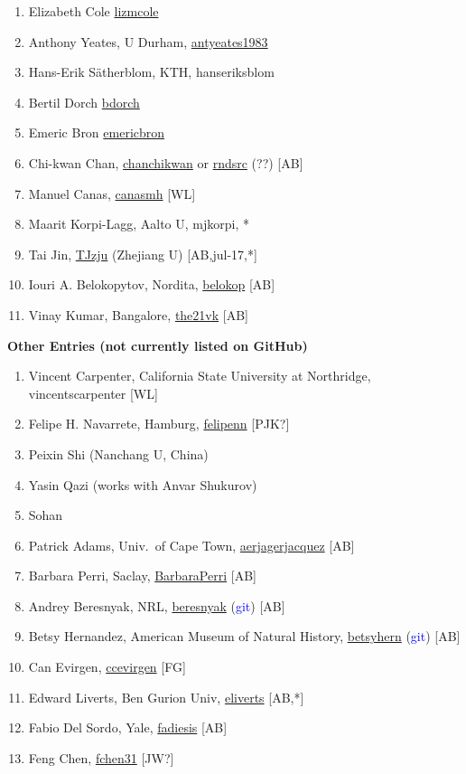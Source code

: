 \documentclass{article}
\def\blue{\textcolor{blue}}
\begin{document}
\begin{enumerate}
\item Elizabeth Cole \url{lizmcole}
\item Anthony Yeates, U Durham, \url{antyeates1983}
\item Hans-Erik S\"atherblom, KTH, hanseriksblom
\item Bertil Dorch \url{bdorch}
\item Emeric Bron \url{emericbron}
\item Chi-kwan Chan, \url{chanchikwan} or \url{rndsrc} (??) [AB]
\item Manuel Canas, \url{canasmh} [WL]
\item Maarit Korpi-Lagg, Aalto U, mjkorpi, *
\item Tai Jin, \url{TJzju} (Zhejiang U) [AB,jul-17,*] %
\item Iouri A. Belokopytov, Nordita, \url{belokop} [AB]
\item Vinay Kumar, Bangalore, \url{the21vk} [AB]
\end{enumerate}

\noindent
{\Large\bf Other Entries (not currently listed on GitHub)}

\begin{enumerate}\itemsep-0.2mm
\item Vincent Carpenter, California State University at Northridge, vincentscarpenter [WL] %
\item Felipe H. Navarrete, Hamburg, \url{felipenn} [PJK?]  %
\item Peixin Shi (Nanchang U, China) %
\item Yasin Qazi (works with Anvar Shukurov)
\item Sohan %
\item Patrick Adams, Univ.\ of Cape Town, \url{aerjagerjacquez} [AB]
\item Barbara Perri, Saclay, \url{BarbaraPerri} [AB]
\item Andrey Beresnyak, NRL, \url{beresnyak} (\blue{git}) [AB]
\item Betsy Hernandez, American Museum of Natural History, \url{betsyhern} (\blue{git}) [AB]
\item Can Evirgen, \url{ccevirgen} [FG]
\item Edward Liverts, Ben Gurion Univ, \url{eliverts} [AB,*]
\item Fabio Del Sordo, Yale, \url{fadiesis} [AB]
\item Feng Chen, \url{fchen31} [JW?]
\end{enumerate}
\end{document}
